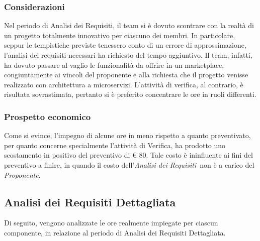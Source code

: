 \subsubsection{Considerazioni}
Nel periodo di Analisi dei Requisiti, il team si è dovuto scontrare con la realtà di un progetto totalmente innovativo per ciascuno dei membri. In particolare, seppur le tempistiche previste tenessero conto di un errore di approssimazione, l'analisi dei requisiti necessari ha richiesto del tempo aggiuntivo. Il team, infatti, ha dovuto passare al vaglio le funzionalità da offrire in un marketplace, congiuntamente ai vincoli del proponente e alla richiesta che il progetto venisse realizzato con architettura a microservizi. L'attività di verifica, al contrario, è risultata sovrastimata, pertanto si è preferito concentrare le ore in ruoli differenti.

\subsubsection{Prospetto economico}
Come si evince, l'impegno di alcune ore in meno rispetto a quanto preventivato, per quanto concerne specialmente l'attività di Verifica, ha prodotto uno scostamento in positivo del preventivo di € 80. Tale costo è ininfluente ai fini del preventivo a finire, in quando il costo dell'\textit{Analisi dei Requisiti}\ non è a carico del \textit{Proponente}.


\newpage
\subsection{Analisi dei Requisiti Dettagliata}

Di seguito, vengono analizzate le ore realmente impiegate per ciascun componente, in relazione al periodo di Analisi dei Requisiti Dettagliata.

